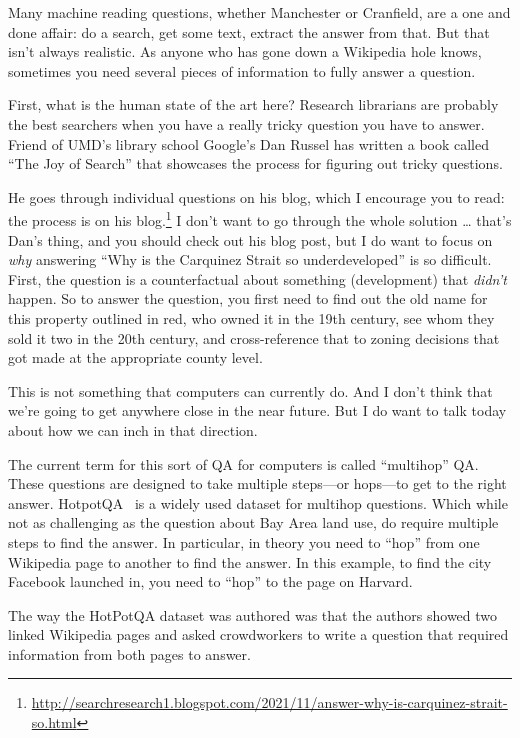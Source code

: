 Many machine reading questions, whether Manchester or Cranfield, are a one and done affair: do a search, get some text, extract the answer from that.  But that isn’t always realistic.  As anyone who has gone down a Wikipedia hole knows, sometimes you need several pieces of information to fully answer a question.  

First, what is the human state of the art here?  Research librarians are probably the best searchers when you have a really tricky question you have to answer.  Friend of UMD’s library school Google’s Dan Russel has written a book called “The Joy of Search” that showcases the process for figuring out tricky questions.

He goes through individual questions on his blog, which I encourage you to read: the process is on his blog.\footnote{\url{http://searchresearch1.blogspot.com/2021/11/answer-why-is-carquinez-strait-so.html}}  I don’t want to go through the whole solution … that’s Dan’s thing, and you should check out his blog post, but I do want to focus on \emph{why} answering “Why is the Carquinez Strait so underdeveloped” is so difficult.  First, the question is a counterfactual about something (development) that \emph{didn’t} happen.  So to answer the question, you first need to find out the old name for this property outlined in red, who owned it in the 19th century, see whom they sold it two in the 20th century, and cross-reference that to zoning decisions that got made at the appropriate county level.

This is not something that computers can currently do.  And I don’t think that we’re going to get anywhere close in the near future.  But I do want to talk today about how we can inch in that direction.

The current term for this sort of QA for computers is called “multihop” QA.  These questions are designed to take multiple steps—or hops—to get to the right answer.  HotpotQA~\citep{Yang2018HotpotQAAD} is a widely used dataset for multihop questions.  Which while not as challenging as the question about Bay Area land use, do require multiple steps to find the answer.  In particular, in theory you need to “hop” from one Wikipedia page to another to find the answer.  In this example, to find the city Facebook launched in, you need to “hop” to the page on Harvard.

The way the HotPotQA dataset was authored was that the authors showed two linked Wikipedia pages and asked crowdworkers to write a question that required information from both pages to answer.  

